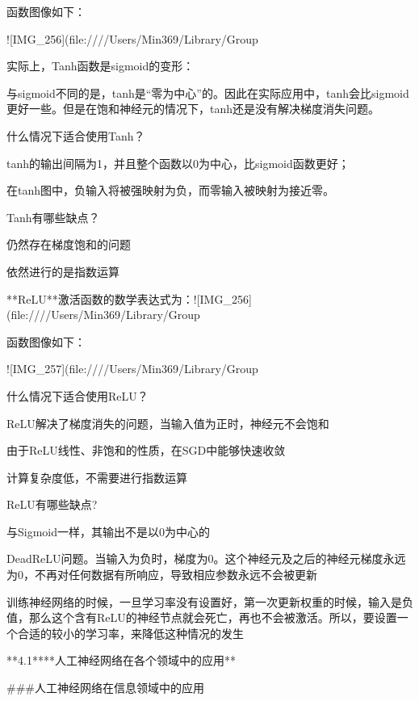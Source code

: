 函数图像如下：



![IMG_256](file:////Users/Min369/Library/Group%





实际上，Tanh函数是sigmoid的变形：

与sigmoid不同的是，tanh是“零为中心”的。因此在实际应用中，tanh会比sigmoid更好一些。但是在饱和神经元的情况下，tanh还是没有解决梯度消失问题。

什么情况下适合使用Tanh？

tanh的输出间隔为1，并且整个函数以0为中心，比sigmoid函数更好；

在tanh图中，负输入将被强映射为负，而零输入被映射为接近零。

Tanh有哪些缺点？

仍然存在梯度饱和的问题

依然进行的是指数运算





**ReLU**激活函数的数学表达式为：![IMG_256](file:////Users/Min369/Library/Group%

函数图像如下：

![IMG_257](file:////Users/Min369/Library/Group%

什么情况下适合使用ReLU？

ReLU解决了梯度消失的问题，当输入值为正时，神经元不会饱和

由于ReLU线性、非饱和的性质，在SGD中能够快速收敛

计算复杂度低，不需要进行指数运算

ReLU有哪些缺点?

与Sigmoid一样，其输出不是以0为中心的

DeadReLU问题。当输入为负时，梯度为0。这个神经元及之后的神经元梯度永远为0，不再对任何数据有所响应，导致相应参数永远不会被更新

训练神经网络的时候，一旦学习率没有设置好，第一次更新权重的时候，输入是负值，那么这个含有ReLU的神经节点就会死亡，再也不会被激活。所以，要设置一个合适的较小的学习率，来降低这种情况的发生

**4.1****人工神经网络在各个领域中的应用**



###人工神经网络在信息领域中的应用

